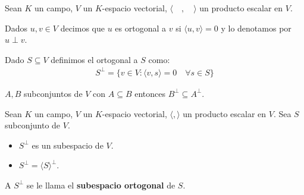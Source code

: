 \begin{definition}{}{}
    Sean $K$ un campo, $V$ un $K$-espacio vectorial, $\langle \quad, \quad \rangle$ un producto escalar en $V$. 

    Dados $u,v \in V$ decimos que $u$ es ortogonal a $v$ si $\langle u,v \rangle = 0$ y lo denotamos por $u \perp v$.

    Dado $S \subseteq V$ definimos el ortogonal a $S$ como:
    \begin{align*}
        S^{\perp} = \{ v \in V : \langle v, s \rangle = 0 \quad \forall s \in S \}
    \end{align*}
\end{definition}
\begin{obs}{}{}
    $A,B$ subconjuntos de $V$ con $A \subseteq B$ entonces $B^{\perp} \subseteq A^{\perp}$.
\end{obs}
\begin{proposition}{}{}
    Sean $K$ un campo, $V$ un $K$-espacio vectorial, $\langle , \rangle$ un producto escalar en $V$. Sea $S$ subconjunto de $V$.
    \begin{itemize}
        \item $S^{\perp}$ es un subespacio de $V$.
        \item $S^{\perp} = \langle S \rangle ^{\perp}$.
    \end{itemize}
\end{proposition}
\begin{notation}{}{}
    A $S^{\perp}$ se le llama el \textbf{subespacio ortogonal} de $S$.
\end{notation}


